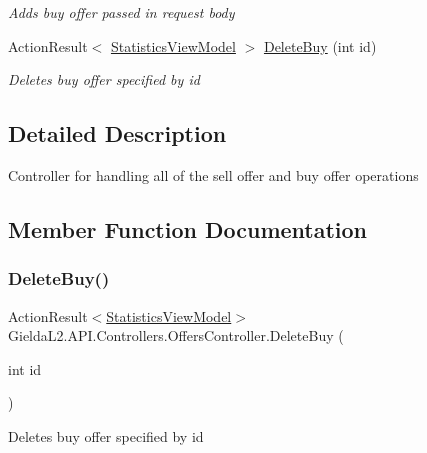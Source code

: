 \begin{DoxyCompactItemize}
\begin{DoxyCompactList}\small\item\em Adds buy offer passed in request body \end{DoxyCompactList}\item 
Action\+Result$<$ \mbox{\hyperlink{class_gielda_l2_1_1_a_p_i_1_1_view_models_1_1_view_1_1_statistics_view_model}{Statistics\+View\+Model}} $>$ \mbox{\hyperlink{class_gielda_l2_1_1_a_p_i_1_1_controllers_1_1_offers_controller_a078d345982da520c9a7d40de6d7a99e6}{Delete\+Buy}} (int id)
\begin{DoxyCompactList}\small\item\em Deletes buy offer specified by id \end{DoxyCompactList}\end{DoxyCompactItemize}


\subsection{Detailed Description}
Controller for handling all of the sell offer and buy offer operations 



\subsection{Member Function Documentation}
\mbox{\label{class_gielda_l2_1_1_a_p_i_1_1_controllers_1_1_offers_controller_a078d345982da520c9a7d40de6d7a99e6}} 
\subsubsection{\texorpdfstring{DeleteBuy()}{DeleteBuy()}}
{\footnotesize\ttfamily Action\+Result$<$\mbox{\hyperlink{class_gielda_l2_1_1_a_p_i_1_1_view_models_1_1_view_1_1_statistics_view_model}{Statistics\+View\+Model}}$>$ Gielda\+L2.\+A\+P\+I.\+Controllers.\+Offers\+Controller.\+Delete\+Buy (\begin{DoxyParamCaption}\item[{int}]{id }\end{DoxyParamCaption})}



Deletes buy offer specified by id 


